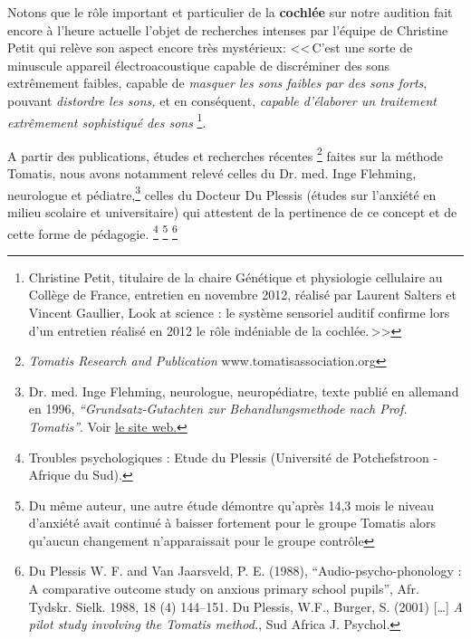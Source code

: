 {\begin{quotation}
\end{quotation}


 Notons que le  rôle important et
particulier 
de la \textbf{cochlée} sur notre audition fait encore à l'heure
actuelle l'objet de recherches intenses
par l'équipe de Christine Petit qui relève
son aspect encore très mystérieux:
<<\,C'est une sorte de minuscule appareil électroacoustique capable
de discréminer des sons extrêmement faibles, capable de \emph{masquer
les sons faibles par des sons forts}, pouvant \emph{distordre les
sons,} et en conséquent, \emph{capable d'élaborer un traitement extrêmement
sophistiqué des sons}%
\footnote{Christine Petit, titulaire de la chaire Génétique et
physiologie cellulaire au Collège de France, entretien en novembre 2012, 
réalisé par Laurent Salters et Vincent Gaullier, 
Look at science : le système sensoriel auditif confirme 
lors d'un entretien réalisé en 2012 le rôle indéniable de la cochlée.\,>>}.


 A partir des publications, études et recherches récentes \footnote{\emph{Tomatis Research and Publication} www.tomatisassociation.org}    faites sur la
 méthode Tomatis, nous avons notamment
 relevé celles du Dr. med. Inge Flehming, neurologue et 
pédiatre,\footnote{Dr. med. Inge Flehming,
	neurologue, neuropédiatre, texte publié en allemand
	en 1996, \emph{``Grundsatz-Gutachten zur Behandlungsmethode
		nach Prof. Tomatis''}. Voir 
\href{http://www.analytische-hoertherapie.de/uploads/tx\_templavoila/Grundsatzgu
tachten\_zur\_Behandlungsmethode\_nach\_Prof.\_Tomatis.pdf}{le site web.}}
 celles du Docteur Du Plessis (études sur l'anxiété en
 milieu scolaire et universitaire) qui  attestent de la pertinence de ce
 concept et de cette forme de pédagogie. \footnote{Troubles 
psychologiques : Etude du Plessis (Université de Potchefstroon
- Afrique du Sud).}  \footnote{Du même auteur, une autre étude démontre qu'après 14,3
mois le niveau d'an\-xié\-té avait continué à baisser fortement
pour le groupe Tomatis alors qu'aucun
changement n'apparaissait pour le groupe contrôle}%
\footnote{Du Plessis W. F. and Van Jaarsveld, P. E. (1988),
	``Audio-psycho-phonology : A comparative outcome study on anxious 
primary school pupils'',  Afr. Tydskr. Sielk. 1988,
	18 (4) 144--151. Du Plessis, W.F., Burger, S. (2001) [\ldots]
	\emph{A pilot study involving the Tomatis method.}, Sud Africa J. 
Psychol.}
 
}
